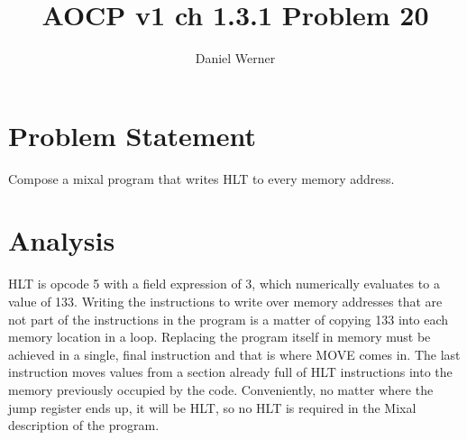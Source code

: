 \documentclass{article}
\title{AOCP v1 ch 1.3.1 Problem 20}
\author{Daniel Werner}
\begin{document}
\maketitle

\section*{
    Problem Statement
}

Compose a mixal program that writes HLT to every memory address.

\section*{
    Analysis
}

HLT is opcode 5 with a field expression of 3, which numerically evaluates to a value of 133.
Writing the instructions to write over memory addresses that are not part of the instructions
in the program is a matter of copying 133 into each memory location in a loop.  Replacing the
program itself in memory must be achieved in a single, final instruction and that is where
MOVE comes in.  The last instruction moves values from a section already full of HLT
instructions into the memory previously occupied by the code.  Conveniently, no matter where
the jump register ends up, it will be HLT, so no HLT is required in the Mixal description of
the program.
\end{document}
